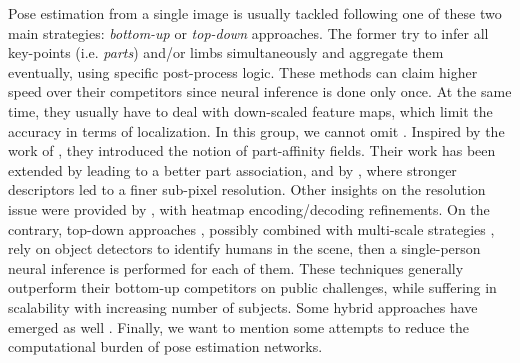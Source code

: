 \documentclass[a4paper,conference]{IEEEtran}
\begin{document}
Pose estimation from a single image is usually tackled following one of these two main strategies: \textit{bottom-up} or \textit{top-down} approaches. The former try to infer all key-points (i.e. \textit{parts}) and/or limbs simultaneously and aggregate them eventually, using specific post-process logic. These methods can claim higher speed over their competitors since neural inference is done only once. At the same time, they usually have to deal with down-scaled feature maps, which limit the accuracy in terms of localization. In this group, we cannot omit \cite{cao2017realtime}. Inspired by the work of  \cite{wei2016convolutional}, they introduced the notion of part-affinity fields. Their work has been extended by \cite{newell2017associative, papandreou2018personlab} leading to a better part association, and by \cite{kreiss2019pifpaf}, where stronger descriptors led to a finer sub-pixel resolution. Other insights on the resolution issue were provided by \cite{feng2019}, with heatmap encoding/decoding refinements. On the contrary, top-down approaches \cite{newell2016stacked, chen2018cascaded, xiao2018simple}, possibly combined with multi-scale strategies \cite{ke2018multi, sun2019deep}, rely on object detectors to identify humans in the scene, then a single-person neural inference is performed for each of them. These techniques generally outperform their bottom-up competitors on public challenges, while suffering in scalability with increasing number of subjects. Some hybrid approaches have emerged as well \cite{kocabas2018multiposenet}. Finally, we want to mention some attempts \cite{osokin2018lightweight_openpose, zhang2019cvpr} to reduce the computational burden of pose estimation networks.
\end{document}
